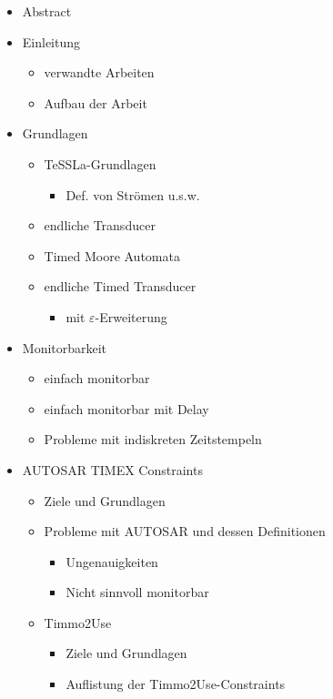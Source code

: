 \documentclass[]{article}
\begin{document}
\begin{itemize}
	\item
		Abstract
	\item
		Einleitung
		\begin{itemize}
			\item
				verwandte Arbeiten
			\item
				Aufbau der Arbeit
		\end{itemize}
	\item
		Grundlagen
		\begin{itemize}
			\item
				TeSSLa-Grundlagen
				\begin{itemize}
					\item
					Def. von Strömen u.s.w.
				\end{itemize}
			\item
				endliche Transducer
			\item
				Timed Moore Automata
			\item
				endliche Timed Transducer
				\begin{itemize}
					\item
						mit $\varepsilon$-Erweiterung
				\end{itemize}
		\end{itemize}
	\item
		Monitorbarkeit
		\begin{itemize}
			\item
				einfach monitorbar
			\item
				einfach monitorbar mit Delay
			\item
				Probleme mit indiskreten Zeitstempeln
		\end{itemize}
	\item
		AUTOSAR TIMEX Constraints
		\begin{itemize}
			\item
				Ziele und Grundlagen
			\item
				Probleme mit AUTOSAR und dessen Definitionen
				\begin{itemize}
					\item
						Ungenauigkeiten
					\item
						Nicht sinnvoll monitorbar
				\end{itemize}
			\item
				Timmo2Use
				\begin{itemize}
					\item
						Ziele und Grundlagen
					\item
						Auflistung der Timmo2Use-Constraints

\end{itemize}
\end{itemize}
\end{itemize}
\end{document}
